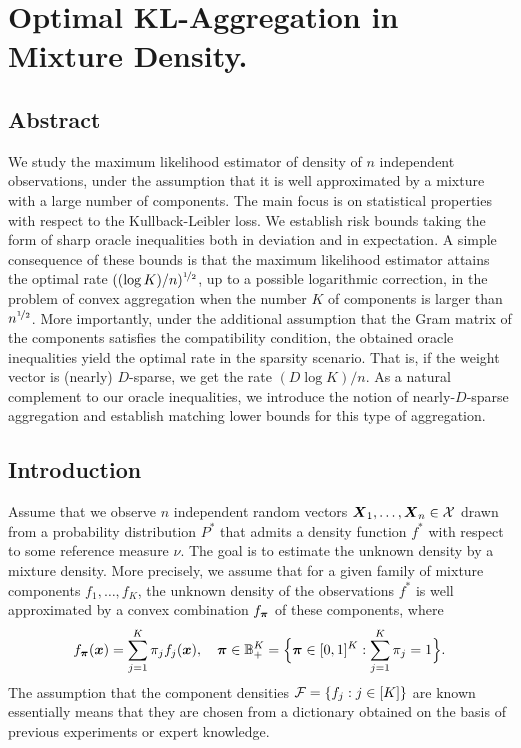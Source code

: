 
\chapter{Optimal KL-Aggregation in Mixture Density.\label{chap:kl_aggreg}}

\section{Abstract}
	We study the maximum likelihood estimator of density of $n$ independent observations, 
	under the assumption that it is well approximated by a mixture with a large number of 
	components. The main focus is on statistical properties with respect to the 
	Kullback-Leibler loss. We establish risk bounds taking the form of sharp oracle inequalities
	both in deviation and in expectation. A simple consequence of these bounds is that the 
	maximum likelihood estimator attains the optimal rate $((\log K)/n)^{\nicefrac12}$, up to a 
	possible logarithmic correction, in the problem of convex aggregation when the number 
	$K$ of components is larger than $n^{\nicefrac12}$. More importantly, under the additional 
	assumption that the Gram matrix of the components satisfies the compatibility condition, 
	the obtained oracle inequalities yield the optimal rate in the sparsity scenario. That 
	is, if the weight vector is (nearly) $D$-sparse, we get the rate $(D\log K)/n$. As a
	natural complement to our oracle inequalities, we introduce the notion of nearly-$D$-sparse
	aggregation and establish matching lower bounds for this type of aggregation. 

\section{Introduction}
Assume that we observe $n$ independent random vectors $\boldsymbol X_1,\ldots,\boldsymbol X_n\in\mathcal X$ drawn from a probability distribution $P^*$
that admits a density function $f^*$ with respect to some reference measure $\nu$.
The goal is to estimate the unknown density by a mixture density. More precisely, we assume that for a given family of mixture
components $f_1,\ldots,f_K$, the unknown density of the observations $f^*$ is well approximated by a convex combination
$f_{\boldsymbol \pi}$ of these components, where
\begin{equation}
f_{\boldsymbol \pi}(\boldsymbol x)=\sum_{j=1}^K\pi_j f_j(\boldsymbol x), \quad \boldsymbol \pi \in {\mathbb B}_+^K=\Big\{\boldsymbol \pi\in [0,1]^K: \sum_{j=1}^K\pi_j=1\Big\}.
\end{equation}
The assumption that the component densities $\mathcal F=\{f_j:j\in[K]\}$ are known essentially means that they are chosen from a
dictionary obtained on the basis of previous experiments or expert knowledge.

